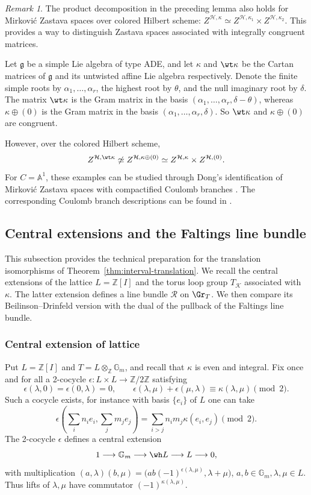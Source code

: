 \documentclass{amsart}
\numberwithin{equation}{section}
\numberwithin{figure}{section}
\theoremstyle{definition}
\theoremstyle{remark}
\newtheorem{rmk}[thm]{Remark}
\renewcommand{\c}[1]{\mathcal{#1}}
\renewcommand{\b}[1]{\mathbb{#1}}
\newcommand{\f}[1]{\mathfrak{#1}}
\begin{document}
\begin{rmk}
	\label{rmk:affine-a-congruence}
	The product decomposition in the preceding lemma also holds
	for Mirkovi\'c Zastava spaces over colored Hilbert scheme: $Z^{\c H,\kappa}
	\simeq
	Z^{\c H,\kappa_1}\times Z^{\c H,\kappa_2}$. This provides a way to distinguish Zastava spaces associated with integrally congruent matrices.
	
	Let $\f g$ be a simple Lie algebra of type ADE, and let
	$\kappa$ and $\wt\kappa$ be the Cartan matrices of $\f g$
	and its untwisted affine Lie algebra respectively.
	Denote the finite simple roots by
	$\alpha_1,\ldots,\alpha_r$, the highest root by $\theta$,
	and the null imaginary root by $\delta$.
	The matrix $\wt\kappa$ is the Gram matrix in the basis
	$(\alpha_1,\ldots,\alpha_r,\delta-\theta)$,
	whereas $\kappa\oplus(0)$ is the Gram matrix in the basis
	$(\alpha_1,\ldots,\alpha_r,\delta).$
	So $\wt\kappa$ and $\kappa\oplus(0)$ are congruent.
	
	However, over the colored Hilbert scheme,
	\[
	Z^{\c H,\wt\kappa}
	\not\simeq
	Z^{\c H,\kappa\oplus(0)}
	\simeq
	Z^{\c H,\kappa}\times Z^{\c H,(0)}.
	\]	
	For $C=\b A^1$, these examples can be studied through
	Dong's identification of Mirkovi\'c Zastava spaces with
	compactified Coulomb branches \cite{dong2026loop}.
	The corresponding Coulomb branch descriptions can be found in
	\cite[\S3(vi), \S3(vii)]{BFN2}.
\end{rmk}




\subsection{Central extensions and the Faltings line bundle}

This subsection provides the technical preparation for
the translation isomorphisms of
Theorem~\ref{thm:interval-translation}.
We recall the central extensions of the lattice $L=\b Z[I]$
and the torus loop group $T_\c K$ associated with $\kappa$.
The latter extension defines a line bundle $\c R$ on $\Gr_T$.
We then compare its Beilinson--Drinfeld version with the
dual of the pullback of the Faltings line bundle.

\subsubsection{Central extension of lattice}\label{wh L}
Put $L=\b Z[I]$ and
$T=L\otimes_{\b Z}\b G_m$, and recall that $\kappa$ is even and integral.
Fix once and for all a 2-cocycle
$\epsilon:L\times L\to\b Z/2\b Z$ satisfying
\[
\epsilon(\lambda,0)=\epsilon(0,\lambda)=0,\qquad
\epsilon(\lambda,\mu)+\epsilon(\mu,\lambda)
\equiv\kappa(\lambda,\mu)\pmod 2.
\]
Such a cocycle exists, for instance with basis $\{e_i\}$ of $L$ one can take
\[
\epsilon\left(\sum_i n_i e_i,\sum_j m_j e_j\right)
=\sum_{i>j}n_i m_j\kappa(e_i,e_j)\pmod 2.
\]
The 2-cocycle $\epsilon$ defines a central extension
\[
1\longrightarrow\b G_m\longrightarrow\wh L
\longrightarrow L\longrightarrow0,
\]
with multiplication
$(a,\lambda)(b,\mu)
=\bigl(ab(-1)^{\epsilon(\lambda,\mu)},\lambda+\mu\bigr)$, $a,b\in \b G_m, \lambda,\mu\in L$.
Thus lifts of $\lambda,\mu$ have commutator $(-1)^{\kappa(\lambda,\mu)}$. 
\end{document}
